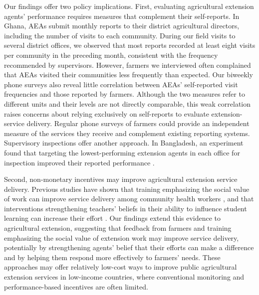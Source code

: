 \documentclass[11pt]{article}
\begin{document}
Our findings offer two policy implications. First, evaluating agricultural extension agents' performance requires measures that complement their self-reports. In Ghana, AEAs submit monthly reports to their district agricultural directors, including the number of visits to each community. During our field visits to several district offices, we observed that most reports recorded at least eight visits per community in the preceding month, consistent with the frequency recommended by supervisors. However, farmers we interviewed often complained that AEAs visited their communities less frequently than expected. Our biweekly phone surveys also reveal little correlation between AEAs' self-reported visit frequencies and those reported by farmers. Although the two measures refer to different units and their levels are not directly comparable, this weak correlation raises concerns about relying exclusively on self-reports to evaluate extension-service delivery. Regular phone surveys of farmers could provide an independent measure of the services they receive and complement existing reporting systems. Supervisory inspections offer another approach. In Bangladesh, an experiment found that targeting the lowest-performing extension agents in each office for inspection improved their reported performance \citep{Alam2024}. 

Second, non-monetary incentives may improve agricultural extension service delivery. Previous studies have shown that training emphasizing the social value of work can improve service delivery among community health workers \citep{Khan2025}, and that interventions strengthening teachers' beliefs in their ability to influence student learning can increase their effort \citep{Kaur2023}. Our findings extend this evidence to agricultural extension, suggesting that feedback from farmers and training emphasizing the social value of extension work may improve service delivery, potentially by strengthening agents' belief that their efforts can make a difference and by helping them respond more effectively to farmers' needs. These approaches may offer relatively low-cost ways to improve public agricultural extension services in low-income countries, where conventional monitoring and performance-based incentives are often limited. 
\end{document}
